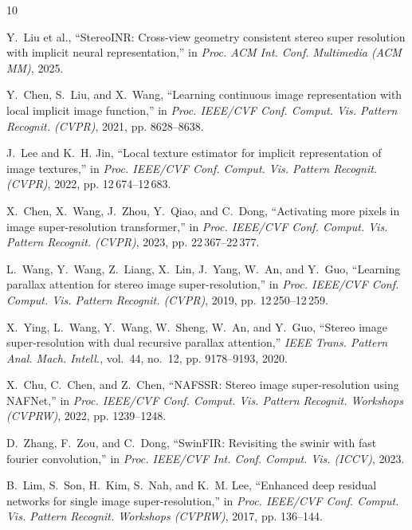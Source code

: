 \documentclass[10pt,journal,compsoc]{IEEEtran}
\begin{document}
\begin{thebibliography}{10}

Y.~Liu et al., ``StereoINR: Cross-view geometry consistent stereo super resolution with implicit neural representation,'' in \emph{Proc. ACM Int. Conf. Multimedia (ACM MM)}, 2025.

Y.~Chen, S.~Liu, and X.~Wang, ``Learning continuous image representation with local implicit image function,'' in \emph{Proc. IEEE/CVF Conf. Comput. Vis. Pattern Recognit. (CVPR)}, 2021, pp. 8628--8638.

J.~Lee and K.~H. Jin, ``Local texture estimator for implicit representation of image textures,'' in \emph{Proc. IEEE/CVF Conf. Comput. Vis. Pattern Recognit. (CVPR)}, 2022, pp. 12\,674--12\,683.

X.~Chen, X.~Wang, J.~Zhou, Y.~Qiao, and C.~Dong, ``Activating more pixels in image super-resolution transformer,'' in \emph{Proc. IEEE/CVF Conf. Comput. Vis. Pattern Recognit. (CVPR)}, 2023, pp. 22\,367--22\,377.

L.~Wang, Y.~Wang, Z.~Liang, X.~Lin, J.~Yang, W.~An, and Y.~Guo, ``Learning parallax attention for stereo image super-resolution,'' in \emph{Proc. IEEE/CVF Conf. Comput. Vis. Pattern Recognit. (CVPR)}, 2019, pp. 12\,250--12\,259.

X.~Ying, L.~Wang, Y.~Wang, W.~Sheng, W.~An, and Y.~Guo, ``Stereo image super-resolution with dual recursive parallax attention,'' \emph{IEEE Trans. Pattern Anal. Mach. Intell.}, vol.~44, no.~12, pp. 9178--9193, 2020.

X.~Chu, C.~Chen, and Z.~Chen, ``NAFSSR: Stereo image super-resolution using NAFNet,'' in \emph{Proc. IEEE/CVF Conf. Comput. Vis. Pattern Recognit. Workshops (CVPRW)}, 2022, pp. 1239--1248.

D.~Zhang, F.~Zou, and C.~Dong, ``SwinFIR: Revisiting the swinir with fast fourier convolution,'' in \emph{Proc. IEEE/CVF Int. Conf. Comput. Vis. (ICCV)}, 2023.

B.~Lim, S.~Son, H.~Kim, S.~Nah, and K.~M. Lee, ``Enhanced deep residual networks for single image super-resolution,'' in \emph{Proc. IEEE/CVF Conf. Comput. Vis. Pattern Recognit. Workshops (CVPRW)}, 2017, pp. 136--144.


\end{thebibliography}
\end{document}
